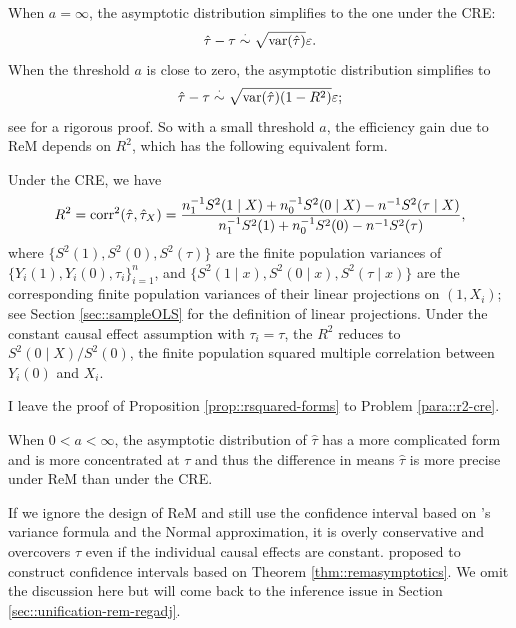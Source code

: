 When $a  = \infty$, the asymptotic distribution  simplifies to the one under the CRE:
$$
\hat{\tau} - \tau \stackrel{\cdot}{\sim} \sqrt{ \textup{var}(\hat \tau) } \varepsilon .
$$
When the threshold $a$ is close to zero, the asymptotic distribution  simplifies to
$$
\hat{\tau} - \tau \stackrel{\cdot}{\sim} \sqrt{ \textup{var}(\hat \tau) (1-R^2)} \varepsilon ;
$$
see \citet{wang2022rerandomization} for a rigorous proof.
So with a small threshold $a$, the efficiency gain due to ReM depends on $R^2$, which has the following equivalent form. 
\begin{proposition}
\label{prop::rsquared-forms}
Under the CRE, we have 
$$
R^2 = \textup{corr}^2(\hat{\tau}, \hat{\tau}_X   )
= \frac{  n_1^{-1}  S^2(1\mid X) + n_0^{-1} S^2(0\mid X) - n^{-1} S^2(\tau \mid X) }
{ n_1^{-1}  S^2( 1 ) + n_0^{-1} S^2( 0 ) - n^{-1} S^2( \tau  )},
$$
where $\{S^2( 1 ) , S^2( 0 ), S^2( \tau  )\}$ are the finite population variances of $\{ Y_i(1), Y_i(0), \tau_i \}_{i=1}^n$, and $\{S^2( 1 \mid x ) , S^2( 0 \mid x ), S^2( \tau  \mid x )\}$ are the corresponding finite population variances of their linear projections on $(1, X_i)$; see Section \ref{sec::sampleOLS} for the definition of linear projections. 
Under the constant causal effect assumption with $\tau_i = \tau$, the $R^2 $ reduces to $S^2(0\mid X) / S^2( 0 ) $, the finite population squared multiple correlation between $Y_i(0)$ and $X_i$.
\end{proposition}

I leave the proof of Proposition \ref{prop::rsquared-forms} to Problem \ref{para::r2-cre}. 

When $ 0 < a <\infty$, the asymptotic distribution of $\hat{\tau}$ has a more complicated form and is more concentrated at $\tau$ and thus the difference in means $\hat{\tau}$ is more precise under ReM than under the CRE. 


If we ignore the design of ReM and still use the confidence interval based on \cite{Neyman:1923}'s variance formula and the Normal approximation, it is overly conservative and overcovers $\tau$ even if the individual causal effects are constant. \citet{li2018asymptotic} proposed to construct confidence intervals based on Theorem \ref{thm::remasymptotics}. We omit the discussion here but will come back to the inference issue in Section \ref{sec::unification-rem-regadj}. 
 



